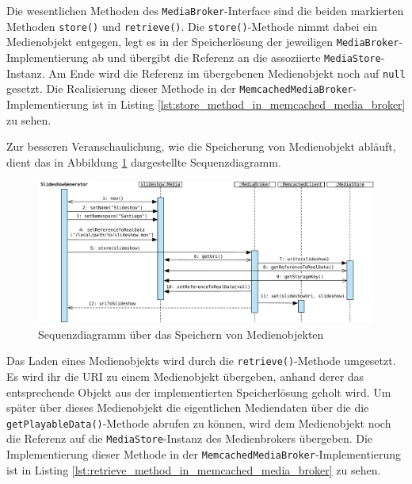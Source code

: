 

  Die wesentlichen Methoden des \verb!MediaBroker!-Interface sind die beiden markierten Methoden \verb!store()! und \verb!retrieve()!. Die \verb!store()!-Methode nimmt dabei ein Medienobjekt entgegen, legt es in der Speicherlösung der jeweiligen \verb!MediaBroker!-Implementierung ab und übergibt die Referenz an die assoziierte \verb!MediaStore!-Instanz. Am Ende wird die Referenz im übergebenen Medienobjekt noch auf \verb!null! gesetzt. Die Realisierung dieser Methode in der \verb!MemcachedMediaBroker!-Implementierung ist in Listing \ref{lst:store_method_in_memcached_media_broker} zu sehen.

  
  
  Zur besseren Veranschaulichung, wie die Speicherung von Medienobjekt abläuft, dient das in Abbildung \ref{fig:speichern_von_medienobjekten} dargestellte Sequenzdiagramm.

  \begin{figure}[!ht]
    \centering
      \includegraphics[width=\textwidth]{images/Handling_of_Media_Objects_write.pdf}
    \caption{Sequenzdiagramm über das Speichern von Medienobjekten}
    \label{fig:speichern_von_medienobjekten}
  \end{figure}
  
  Das Laden eines Medienobjekts wird durch die \verb!retrieve()!-Methode umgesetzt. Es wird ihr die URI zu einem Medienobjekt übergeben, anhand derer das entsprechende Objekt aus der implementierten Speicherlösung geholt wird. Um später über dieses Medienobjekt die eigentlichen Mediendaten über die die \verb!getPlayableData()!-Methode abrufen zu können, wird dem Medienobjekt noch die Referenz auf die \verb!MediaStore!-Instanz des Medienbrokers übergeben. Die Implementierung dieser Methode in der \verb!MemcachedMediaBroker!-Implementierung ist in Listing \ref{lst:retrieve_method_in_memcached_media_broker} zu sehen.

